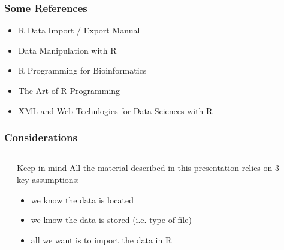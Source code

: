 \documentclass{beamer}\usepackage[]{graphicx}\usepackage[]{color}
\begin{document}

\begin{frame}
\frametitle{Some References}

\begin{itemize}
 \item R Data Import / Export Manual \\
 \item Data Manipulation with R \\
 \item R Programming for Bioinformatics \\
 \item The Art of R Programming \\
 \item XML and Web Technlogies for Data Sciences with R \\
\end{itemize}

\end{frame}


\begin{frame}
\frametitle{Considerations}

\begin{columns}[t]
\begin{column}{0.1\textwidth}
\end{column}
\begin{column}{0.8\textwidth}

\begin{block}{Keep in mind}
All the material described in this presentation relies on 3 key assumptions:  
\begin{itemize}
 \item we know  the data is located
 \item we know  the data is stored (i.e. type of file)
 \item all we want is to import the data in R
\end{itemize}
\end{block}

\end{column}
\begin{column}{0.1\textwidth}
\end{column}
\end{columns}

\end{frame}
\end{document}
